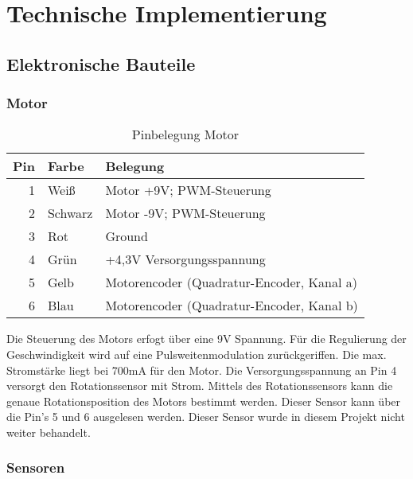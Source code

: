 \chapter{Technische Implementierung}
\section{Elektronische Bauteile}

\subsection{Motor}\label{eb:motor}

\begin{table}[!ht]
\centering
\rmfamily
\caption{Pinbelegung Motor}
\renewcommand{\arraystretch}{1.1}
\sffamily
\begin{footnotesize}
\begin{tabular}{r | l l}
\toprule
\textbf{Pin} & \textbf{Farbe}  & \textbf{Belegung}\\
\midrule
1 & Weiß & Motor +9V; PWM-Steuerung \\
2 & Schwarz & Motor -9V; PWM-Steuerung \\
3 & Rot & Ground \\
4 & Grün & +4,3V Versorgungsspannung \\
5 & Gelb & Motorencoder (Quadratur-Encoder, Kanal a) \\
6 & Blau & Motorencoder (Quadratur-Encoder, Kanal b) \\
\bottomrule
\end{tabular}
\end{footnotesize}
\label{eb:motor:tbl}
\end{table}

Die Steuerung des Motors erfogt über eine 9V Spannung. Für die Regulierung der Geschwindigkeit wird auf eine Pulsweitenmodulation zurückgeriffen. Die max. Stromstärke liegt bei 700mA für den Motor.  Die Versorgungsspannung an Pin 4 versorgt den Rotationssensor mit Strom. Mittels des Rotationssensors kann die genaue Rotationsposition des Motors bestimmt werden. Dieser Sensor kann über die Pin's 5 und 6 ausgelesen werden. Dieser Sensor wurde in diesem Projekt nicht weiter behandelt.


\subsection{Sensoren}\label{eb:sensor}


